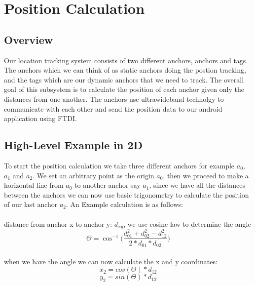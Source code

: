 

\chapter{Position Calculation} %

\label{PositionCalculation}


\section{Overview}

Our location tracking system consists of two different anchors, anchors and tags. The anchors which we can think of as static anchors doing the postion tracking, and the tags which are our dynamic anchors that we need to track. The overall goal of this subsystem is to calculate the position of each anchor given only the distances from one another.
The anchors use ultrawideband technolgy to communicate with each other and send the position data to our android application using FTDI.


\section{High-Level Example in 2D}
To start the position calculation we take three different anchors for example $a_{0}$, $ a_{1}$  and $a_{2}$. We set an arbitrary point as the origin $a_{0}$, then we proceed to make a horizontal line from $a_{0}$ to another anchor say $a_{1}$, since we have all the distances between the anchors we can now use basic trigonometry to calculate the position of our last anchor $a_{2}$.
An Example calculation is as follows:
\\\\
distance from anchor x to anchor y: $d_{xy}$, we use cosine law to determine the angle
\\
\[ \Theta = \cos ^{ - 1}\Big(\frac{d_{01}^2 + d_{02}^2 - d_{12}^2 }{2*d_{01}*d_{02}}\Big)\]
\\
when we have the angle we can now calculate the x and y coordinates:
\\
\[ x_2 = cos(\Theta) * d_{12} \]
\[ y_2 = sin(\Theta) *  d_{12} \]

